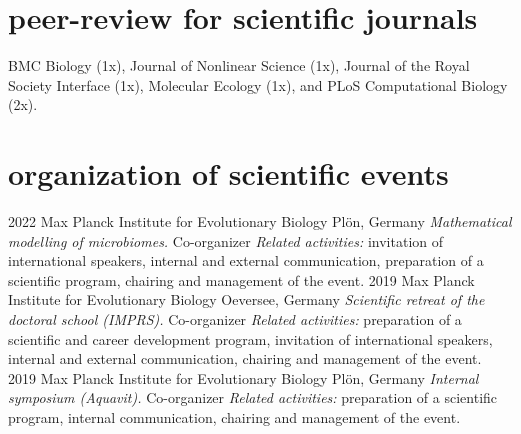 \documentclass[]{friggeri-cv} %
\begin{document}
\section{peer-review for scientific journals}
BMC Biology (1x),  Journal of Nonlinear Science (1x), Journal of the Royal Society Interface (1x), Molecular Ecology (1x), and PLoS Computational Biology (2x).

\section{organization of scientific events}

\begin{entrylist}
\entry
{2022}
{}
{Max Planck Institute for Evolutionary Biology}
{Plön, Germany}
{{\normalsize\emph{Mathematical modelling of microbiomes.} Co-organizer}}
{\emph{Related activities:} invitation of international speakers, internal and external communication, preparation of a scientific program, chairing and management of the event.}
\entry
{2019}
{}
{Max Planck Institute for Evolutionary Biology}
{Oeversee, Germany}
{{\normalsize\emph{Scientific retreat of the doctoral school (IMPRS).} Co-organizer}}
{\emph{Related activities:} preparation of a scientific and career development program, invitation of international speakers, internal and external communication, chairing and management of the event.}
\entry
{2019}
{}
{Max Planck Institute for Evolutionary Biology}
{Plön, Germany}
{{\normalsize\emph{Internal symposium (Aquavit).} Co-organizer}}
{\emph{Related activities:} preparation of a scientific program, internal communication, chairing and management of the event.}
\end{entrylist}

\end{document}
